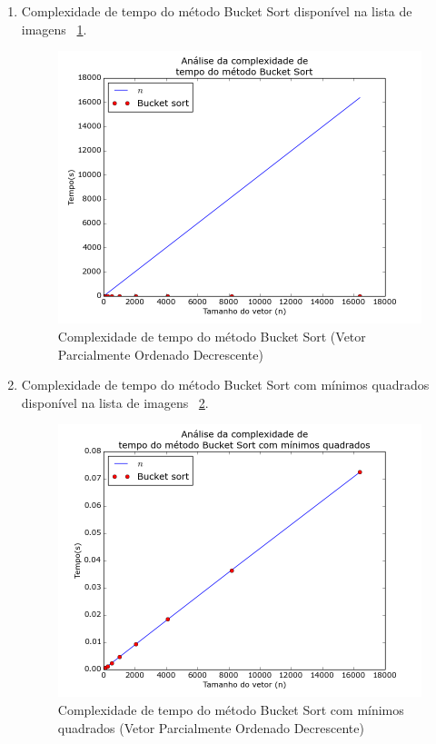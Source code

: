 \documentclass[12pt,a4paper,twoside]{report}
\begin{document}
\begin{enumerate}
										\begin{enumerate}
											\item Complexidade de tempo do método Bucket Sort disponível na lista de imagens ~\ref{fig:BucketPlot2POD}.
											\begin{figure}[!h]
												\centering
												\includegraphics[scale=0.6]{../imagens/Bucket/Bucket_plot_2_parcialmente_ordenado_decrescente.png}
												\caption{Complexidade de tempo do método Bucket Sort (Vetor Parcialmente Ordenado Decrescente) \label{fig:BucketPlot2POD}}
											\end{figure}


											\item Complexidade de tempo do método Bucket Sort com mínimos quadrados disponível na lista de imagens  ~\ref{fig:BucketPlot3POD}.
											\begin{figure}[!h]
												\centering
												\includegraphics[scale=0.6]{../imagens/Bucket/Bucket_plot_3_parcialmente_ordenado_decrescente.png}
												\caption{Complexidade de tempo do método Bucket Sort com mínimos quadrados (Vetor Parcialmente Ordenado Decrescente) \label{fig:BucketPlot3POD}}
											\end{figure}


\end{enumerate}
\end{enumerate}
\end{document}
